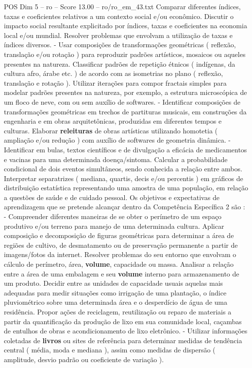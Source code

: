 \begin{textsample}{POS Dim 5 – ro – Score 13.00 – ro/ro\_em\_43.txt}
Comparar diferentes índices, taxas e coeficientes relativos a um contexto social e/ou econômico.
Discutir o impacto social resultante explicitado por índices, taxas e coeficientes na economia local e/ou mundial.
Resolver problemas que envolvam a utilização de taxas e índices diversos. - Usar composições de transformações geométricas ( reflexão, translação e/ou rotação ) para reproduzir padrões artísticos, mosaicos ou aqueles presentes na natureza.
Classificar padrões de repetição étnicos ( indígenas, da cultura afro, árabe etc. ) de acordo com as isometrias no plano ( reflexão, translação e rotação ).
Utilizar iterações para compor fractais simples para modelar padrões presentes na natureza, por exemplo, a estrutura microscópica de um floco de neve, com ou sem auxílio de softwares. - Identificar composições de transformações geométricas em trechos de partituras musicais, em construções da engenharia e em obras arquitetônicas, produzidas em diferentes tempos e culturas.
Elaborar \textbf{releituras} de obras artísticas utilizando homotetia ( ampliação e/ou redução ) com auxílio de softwares de geometria dinâmica. - Identificar em bulas, textos científicos e de divulgação a eficácia de medicamentos e vacinas para uma determinada doença/sintoma.
Calcular a probabilidade condicional de dois eventos simultâneos, sendo conhecida a relação entre ambos.
Interpretar separatrizes ( mediana, quartis, decis e/ou percentis ) em gráficos de distribuição estatística representando uma amostra de uma população, em relação a questões de saúde e de cuidado pessoal.
Os objetivos e expectativas de aprendizagem que se pretende alcançar dentro da Competência Específica 2 são : - Compreender diferentes maneiras de se obter o perímetro de um espaço produtivo e/ou terreno para manejo de uma determinada cultura.
Aplicar composição e decomposição de figuras geométricas para determinar a área de regiões de cultivo, de desmatamento ou de preservação permanente a partir de imagens/fotos da internet.
Resolver problemas do seu entorno que envolvam o cálculo de perímetro, área, \textbf{volume}, capacidade ou massa.
Analisar a relação entre a área de uma embalagem e seu \textbf{volume} interno para armazenamento de um produto.
Decidir entre as unidades de capacidade usuais aquelas mais adequadas para medir situações como irrigação de uma plantação, o índice pluviométrico sobre uma determinada área e o desperdício de água de uma residência.
Propor ações de reciclagem, reutilização ou reparo de materiais a partir da quantificação da produção de lixo em sua comunidade local, caçambas de entulhos de obras e acondicionamento de lixo eletrônico. - Utilizar informações coletadas de \textbf{livros} ou sites de referência para determinar medidas de tendência central ( média, moda e mediana ), assim como medidas de dispersão ( amplitude, desvio padrão ou coeficiente de variação ).

\end{textsample}
